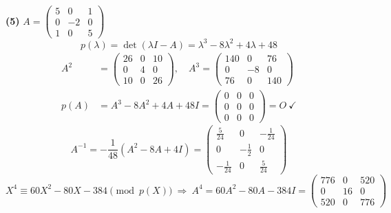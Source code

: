 \noindent\textbf{(5)} $A=\begin{pmatrix}5 & 0 & 1 \\ 0 & -2 & 0 \\ 1 & 0 & 5\end{pmatrix}$
\[ p(\lambda)=\det(\lambda I-A)=\lambda^{3} - 8 \lambda^{2} + 4 \lambda + 48 \]
\begin{align*}
A^2&=\begin{pmatrix}26 & 0 & 10 \\ 0 & 4 & 0 \\ 10 & 0 & 26\end{pmatrix},\quad A^3=\begin{pmatrix}140 & 0 & 76 \\ 0 & -8 & 0 \\ 76 & 0 & 140\end{pmatrix} \\
p(A)&=A^{3} - 8A^{2} + 4A + 48I=\begin{pmatrix}0 & 0 & 0 \\ 0 & 0 & 0 \\ 0 & 0 & 0\end{pmatrix}=O\ \checkmark
\end{align*}
\[ A^{-1}=-\frac{1}{48}\left(A^{2} -8A +4I\right)=\begin{pmatrix}\frac{5}{24} & 0 & - \frac{1}{24} \\ 0 & - \frac{1}{2} & 0 \\ - \frac{1}{24} & 0 & \frac{5}{24}\end{pmatrix} \]
\[ X^4\equiv 60 X^{2} - 80 X - 384\pmod{p(X)}\ \Rightarrow\ A^4=60A^{2} - 80A - 384I=\begin{pmatrix}776 & 0 & 520 \\ 0 & 16 & 0 \\ 520 & 0 & 776\end{pmatrix} \]

